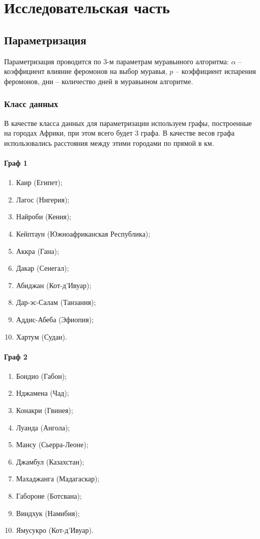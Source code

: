 \chapter{Исследовательская часть}

\section{Параметризация}

Параметризация проводится по 3-м параметрам муравьиного алгоритма: $\alpha$ -- коэффициент влияние феромонов на выбор муравья, $p$ -- коэффициент испарения феромонов, дни -- количество дней в муравьином алгоритме.

\subsection{Класс данных}

В качестве класса данных для параметризации используем графы, построенные на городах Африки, при этом всего будет 3 графа. В качестве весов графа использовались расстояния между этими городами по прямой в км.

\subsubsection{Граф 1}
\begin{enumerate}
	\item Каир (Египет);
	\item Лагос (Нигерия);
	\item Найроби (Кения);
	\item Кейптаун (Южноафриканская Республика);
	\item Аккра (Гана);
	\item Дакар (Сенегал);
	\item Абиджан (Кот-д'Ивуар);
	\item Дар-эс-Салам (Танзания);
	\item Аддис-Абеба (Эфиопия);
	\item Хартум (Судан).
\end{enumerate}

\subsubsection{Граф 2}
\begin{enumerate}
	\item Бондио (Габон);
	\item Нджамена (Чад);
	\item Конакри (Гвинея);
	\item Луанда (Ангола);
	\item Мансу (Сьерра-Леоне);
	\item Джамбул (Казахстан);
	\item Махаджанга (Мадагаскар);
	\item Габороне (Ботсвана);
	\item Виндхук (Намибия);
	\item Ямусукро (Кот-д'Ивуар).
\end{enumerate}

